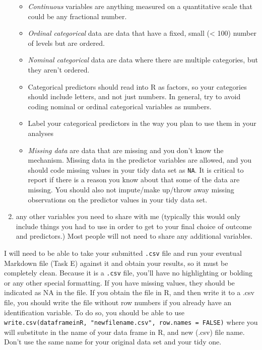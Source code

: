 \documentclass[]{book}
\providecommand{\tightlist}{%
  \setlength{\itemsep}{0pt}\setlength{\parskip}{0pt}}
\theoremstyle{definition}
\theoremstyle{definition}
\theoremstyle{definition}
\theoremstyle{remark}
\begin{document}
\begin{enumerate}
  \begin{itemize}
  \tightlist
  \item
    \emph{Continuous} variables are anything measured on a quantitative
    scale that could be any fractional number.
  \item
    \emph{Ordinal categorical} data are data that have a fixed, small
    (\textless{} 100) number of levels but are ordered.
  \item
    \emph{Nominal categorical} data are data where there are multiple
    categories, but they aren't ordered.
  \item
    Categorical predictors should read into R as factors, so your
    categories should include letters, and not just numbers. In general,
    try to avoid coding nominal or ordinal categorical variables as
    numbers.
  \item
    Label your categorical predictors in the way you plan to use them in
    your analyses
  \item
    \emph{Missing data} are data that are missing and you don't know the
    mechanism. Missing data in the predictor variables are allowed, and
    you should code missing values in your tidy data set as \texttt{NA}.
    It is critical to report if there is a reason you know about that
    some of the data are missing. You should also not impute/make
    up/throw away missing observations on the predictor values in your
    tidy data set.
  \end{itemize}
\item
  any other variables you need to share with me (typically this would
  only include things you had to use in order to get to your final
  choice of outcome and predictors.) Most people will not need to share
  any additional variables.
\end{enumerate}

I will need to be able to take your submitted \texttt{.csv} file and run
your eventual Markdown file (Task E) against it and obtain your results,
so it must be completely clean. Because it is a \texttt{.csv} file,
you'll have no highlighting or bolding or any other special formatting.
If you have missing values, they should be indicated as NA in the file.
If you obtain the file in R, and then write it to a .csv file, you
should write the file without row numbers if you already have an
identification variable. To do so, you should be able to use
\texttt{write.csv(dataframeinR,\ "newfilename.csv",\ row.names\ =\ FALSE)}
where you will substitute in the name of your data frame in R, and new
(.csv) file name. Don't use the same name for your original data set and
your tidy one.
\end{document}
